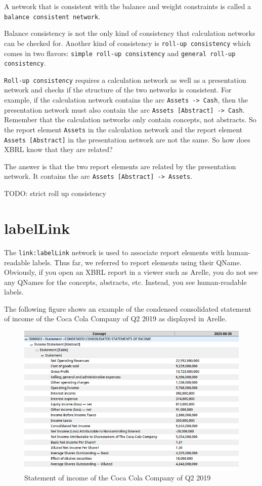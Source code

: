 A network that is consistent with the balance and weight constraints is called a \texttt{balance consistent network}.\cite{fourny2023xbrl}

Balance consistency is not the only kind of consistency that calculation networks can be checked for.
Another kind of consistency is \texttt{roll-up consistency} which comes in two flavors: \texttt{simple roll-up consistency} and \texttt{general roll-up consistency}. 

\texttt{Roll-up consistency} requires a calculation network as well as a presentation network and checks if the structure of the two networks is consistent.
For example, if the calculation network contains the arc \texttt{Assets -> Cash}, then the presentation network must also contain the arc \texttt{Assets [Abstract] -> Cash}.
Remember that the calculation networks only contain concepts, not abstracts. 
So the report element \texttt{Assets} in the calculation network and the report element \texttt{Assets [Abstract]} in the presentation network are not the same.
So how does XBRL know that they are related?

The answer is that the two report elements are related by the presentation network.
It contains the arc \texttt{Assets [Abstract] -> Assets}.

TODO: strict roll up consistency

\section{labelLink}

The \texttt{link:labelLink} network is used to associate report elements with human-readable labels.
Thus far, we referred to report elements using their QName.
Obviously, if you open an XBRL report in a viewer such as Arelle, you do not see any QNames for the concepts, abstracts, etc.
Instead, you see human-readable labels.

The following figure shows an example of the condensed consolidated statement of income of the Coca Cola Company\cite{ko2019q2} of Q2 2019 as displayed in Arelle\cite{arelle}.

\begin{figure}[H]
    \centering
    \includegraphics[width=\textwidth]{images/coca_cola_2019_q2.png}
    \caption{Statement of income of the Coca Cola Company of Q2 2019}
    \label{fig:coca_cola_2019_q2}
\end{figure}

